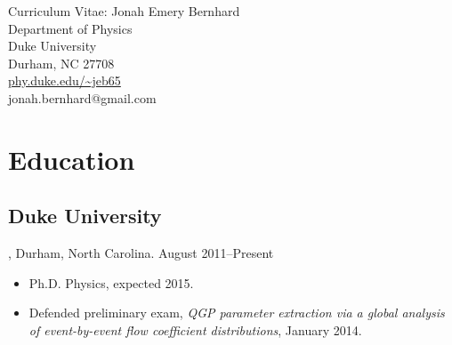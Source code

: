 \documentclass[letterpaper,10pt]{article}
\begin{document}
\begin{center}
  \Large 
  Curriculum Vitae:  Jonah Emery Bernhard \\[1ex]
  \normalsize
  Department of Physics \\
  Duke University \\
  Durham, NC 27708 \\[.5ex]
  \url{phy.duke.edu/~jeb65} \\
  jonah.bernhard@gmail.com
\end{center}


\section{Education}


\subsection{Duke University}, Durham, North Carolina. \hfill August 2011--Present

\begin{itemize}
  \item Ph.D. Physics, expected 2015.
  \item Defended preliminary exam, \emph{QGP parameter extraction via a global analysis of event-by-event flow coefficient distributions}, January 2014.
\end{itemize}

\end{document}
